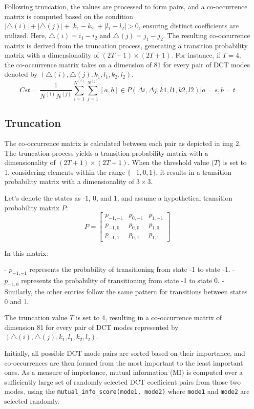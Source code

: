 Following truncation, the values are processed to form pairs, and a co-occurrence matrix is computed based on the condition $|\triangle(i)| + |\triangle(j)| + |k_1 - k_2| + |l_1 - l_2| > 0$, ensuring distinct coefficients are utilized. Here, $\triangle(i) = i_1 - i_2$ and $\triangle(j) = j_1 - j_2$. The resulting co-occurrence matrix is derived from the truncation process, generating a transition probability matrix with a dimensionality of $(2T + 1) \times (2T + 1)$. For instance, if $T = 4$, the co-occurrence matrix takes on a dimension of 81 for every pair of DCT modes denoted by $(\triangle(i), \triangle(j), k_1, l_1, k_2, l_2)$.
\[
    Cst = \frac{1}{N^{(i)}N^{(j)}} \sum_{i=1}^{N^{(i)}} \sum_{j=1}^{N^{(j)}} \left[ a, b \right] \in P (\Delta i, \Delta j, k1, l1, k2, l2) | a = s, b = t
\]

\subsection{Truncation}
The co-occurrence matrix is calculated between each pair as depicted in img 2. The truncation process yields a transition probability matrix with a dimensionality of $(2T + 1) \times (2T + 1)$. When the threshold value ($T$) is set to 1, considering elements within the range $\{-1, 0, 1\}$, it results in a transition probability matrix with a dimensionality of $3 \times 3$.

Let's denote the states as -1, 0, and 1, and assume a hypothetical transition probability matrix $P$:
\[
    P = \begin{bmatrix}
        p_{-1,-1} & p_{0,-1} & p_{1,-1} \\
        p_{-1,0}  & p_{0,0}  & p_{1,0}  \\
        p_{-1,1}  & p_{0,1}  & p_{1,1}
    \end{bmatrix}
\]

In this matrix:

- $p_{-1,-1}$ represents the probability of transitioning from state -1 to state -1.
- $p_{-1,0}$ represents the probability of transitioning from state -1 to state 0.
- Similarly, the other entries follow the same pattern for transitions between states 0 and 1.

The truncation value $T$ is set to 4, resulting in a co-occurrence matrix of dimension 81 for every pair of DCT modes represented by $(\triangle(i), \triangle(j), k_1, l_1, k_2, l_2)$.

Initially, all possible DCT mode pairs are sorted based on their importance, and co-occurrences are then formed from the most important to the least important ones. As a measure of importance, mutual information (MI) is computed over a sufficiently large set of randomly selected DCT coefficient pairs from those two modes, using the \texttt{mutual\_info\_score(mode1, mode2)} where \texttt{mode1} and \texttt{mode2} are selected randomly.

